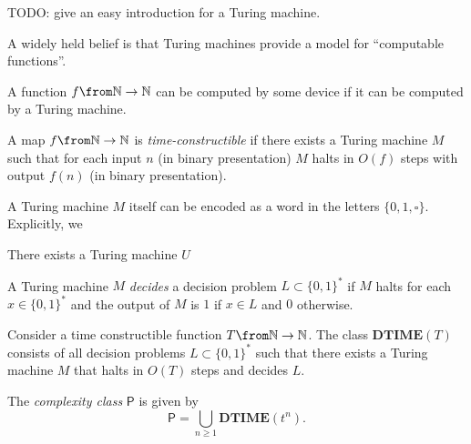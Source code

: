 \documentclass[a4paper,oneside, 12pt]{amsart}
\newcommand*{\Pclass}{\ensuremath{\mathsf{P}}}
\newcommand*{\Dtime}{\ensuremath{\mathbf{DTIME}}}
\begin{document}
\begin{example}\label{ex:add-as-Turing-machine}
  TODO: give an easy introduction for a Turing machine.
\end{example}
A widely held belief is that Turing machines provide a model for ``computable functions''.

\begin{remark}\label{rmk:Church-Turing-thesis}
  A function \(f \from  \mathbb{N} \to  \mathbb{N}\) can be computed by some device if it can be computed by a Turing machine.
\end{remark}


\begin{definition}\label{def:time-constructible-function}
  A map \(f \from \mathbb{N} \to \mathbb{N}\) is \emph{time-constructible} if there exists a Turing machine \(M\) such that for each input \(n\) (in binary presentation) \(M\) halts in \(O(f)\) steps with output \(f(n)\) (in  binary presentation).
\end{definition}

\begin{remark}\label{rmk:encoding-Turing-machines}
  A Turing machine \(M\) itself can be encoded as a word in the letters \(\{0,1, \square\}\).
  Explicitly, we
\end{remark}

\begin{theorem}\label{thm:existence-of-universal-TM}
  There exists a Turing machine \(U\)
\end{theorem}




\begin{definition}\label{def:deciding-a-decision-problem}
  A Turing machine \(M\) \emph{decides} a decision problem \(L \subset\{0,1\}^{*}\) if \(M\) halts for each \(x \in \{0,1\}^{*}\) and the output of \(M\) is \(1\) if \(x\in L\) and \(0\) otherwise.
\end{definition}


\begin{definition}\label{def:Dtime}
  Consider a time constructible function \(T \from \mathbb{N} \to \mathbb{N}\).
  The class \(\Dtime(T)\) consists of all decision problems \(L \subset\{0,1\}^{*}\) such that there exists a Turing machine \(M\) that halts in \(O(T)\) steps and decides \(L\).
\end{definition}


\begin{definition}\label{def:class-p}
  The \emph{complexity class} \(\Pclass\) is given by
  \begin{equation}\label{eq:p-class}
    \Pclass = \bigcup_{n\geq 1} \Dtime(t^{n}).
  \end{equation}
\end{definition}
\end{document}
